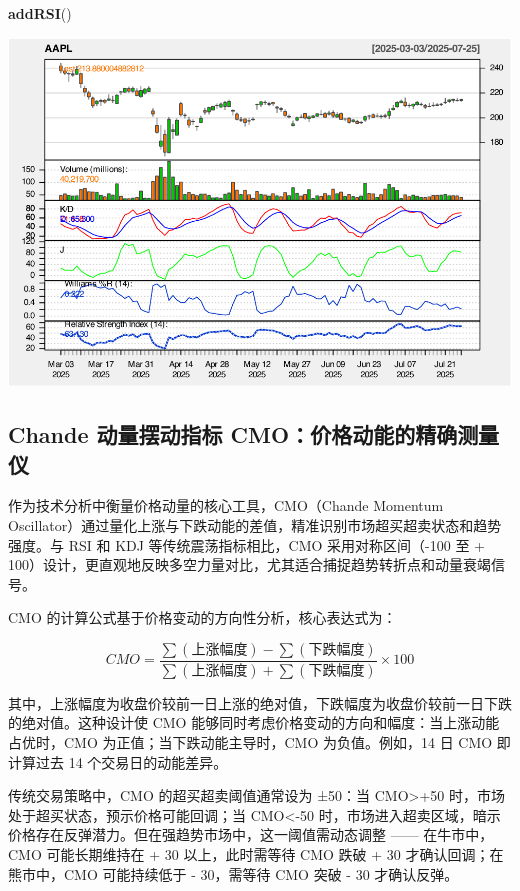 \documentclass[]{ctexbook}
\newenvironment{Shaded}{\begin{snugshade}}{\end{snugshade}}
\newcommand{\FunctionTok}[1]{\textcolor[rgb]{0.13,0.29,0.53}{\textbf{#1}}}
\newcommand{\NormalTok}[1]{#1}
\begin{document}
\begin{Shaded}
\begin{Highlighting}[]
\FunctionTok{addRSI}\NormalTok{()}
\end{Highlighting}
\end{Shaded}

\includegraphics[width=0.9\linewidth]{QuantmodHandbook_files/figure-latex/wpr_2-6}

\subsection{Chande 动量摆动指标 CMO：价格动能的精确测量仪}\label{chande-ux52a8ux91cfux6446ux52a8ux6307ux6807-cmoux4ef7ux683cux52a8ux80fdux7684ux7cbeux786eux6d4bux91cfux4eea}

作为技术分析中衡量价格动量的核心工具，CMO（Chande Momentum Oscillator）通过量化上涨与下跌动能的差值，精准识别市场超买超卖状态和趋势强度。与 RSI 和 KDJ 等传统震荡指标相比，CMO 采用对称区间（-100 至 + 100）设计，更直观地反映多空力量对比，尤其适合捕捉趋势转折点和动量衰竭信号。

CMO 的计算公式基于价格变动的方向性分析，核心表达式为：

\[ CMO = \frac{\sum(\text{上涨幅度}) - \sum(\text{下跌幅度})}{\sum(\text{上涨幅度}) + \sum(\text{下跌幅度})} \times 100\]

其中，上涨幅度为收盘价较前一日上涨的绝对值，下跌幅度为收盘价较前一日下跌的绝对值。这种设计使 CMO 能够同时考虑价格变动的方向和幅度：当上涨动能占优时，CMO 为正值；当下跌动能主导时，CMO 为负值。例如，14 日 CMO 即计算过去 14 个交易日的动能差异。

传统交易策略中，CMO 的超买超卖阈值通常设为 ±50：当 CMO\textgreater+50 时，市场处于超买状态，预示价格可能回调；当 CMO\textless-50 时，市场进入超卖区域，暗示价格存在反弹潜力。但在强趋势市场中，这一阈值需动态调整 ------ 在牛市中，CMO 可能长期维持在 + 30 以上，此时需等待 CMO 跌破 + 30 才确认回调；在熊市中，CMO 可能持续低于 - 30，需等待 CMO 突破 - 30 才确认反弹。
\end{document}
